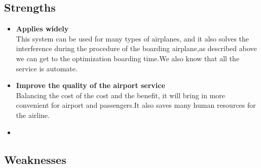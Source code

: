 \documentclass{mcmthesis}
\begin{document}
\subsection{Strengths}
\begin{itemize}
\item \textbf{Applies widely}\\
This  system can be used for many types of airplanes, and it also
solves the interference during  the procedure of the boarding
airplane,as described above we can get to the  optimization
boarding time.We also know that all the service is automate.
\item \textbf{Improve the quality of the airport service}\\
Balancing the cost of the cost and the benefit, it will bring in
more convenient  for airport and passengers.It also saves many
human resources for the airline. \item \textbf{}
\end{itemize}

\subsection{Weaknesses}


\begin{center}
\end{center}
\end{document}
